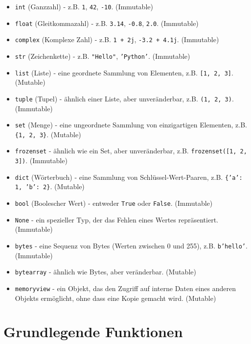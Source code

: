 \documentclass[11pt, oneside]{book}
\begin{document}
\begin{itemize}
    \item \texttt{int} (Ganzzahl) - z.B. \texttt{1}, \texttt{42}, \texttt{-10}. (Immutable)
    \item \texttt{float} (Gleitkommazahl) - z.B. \texttt{3.14}, \texttt{-0.8}, \texttt{2.0}. (Immutable)
    \item \texttt{complex} (Komplexe Zahl) - z.B. \texttt{1 + 2j}, \texttt{-3.2 + 4.1j}. (Immutable)
    \item \texttt{str} (Zeichenkette) - z.B. \texttt{"Hello"}, \texttt{'Python'}. (Immutable)
    \item \texttt{list} (Liste) - eine geordnete Sammlung von Elementen, z.B. \texttt{[1, 2, 3]}. (Mutable)
    \item \texttt{tuple} (Tupel) - ähnlich einer Liste, aber unveränderbar, z.B. \texttt{(1, 2, 3)}. (Immutable)
    \item \texttt{set} (Menge) - eine ungeordnete Sammlung von einzigartigen Elementen, z.B. \texttt{\{1, 2, 3\}}. (Mutable)
    \item \texttt{frozenset} - ähnlich wie ein Set, aber unveränderbar, z.B. \texttt{frozenset([1, 2, 3])}. (Immutable)
    \item \texttt{dict} (Wörterbuch) - eine Sammlung von Schlüssel-Wert-Paaren, z.B. \texttt{\{'a': 1, 'b': 2\}}. (Mutable)
    \item \texttt{bool} (Boolescher Wert) - entweder \texttt{True} oder \texttt{False}. (Immutable)
    \item \texttt{None} - ein spezieller Typ, der das Fehlen eines Wertes repräsentiert. (Immutable)
    \item \texttt{bytes} - eine Sequenz von Bytes (Werten zwischen 0 und 255), z.B. \texttt{b'hello'}. (Immutable)
    \item \texttt{bytearray} - ähnlich wie Bytes, aber veränderbar. (Mutable)
    \item \texttt{memoryview} - ein Objekt, das den Zugriff auf interne Daten eines anderen Objekts ermöglicht, ohne dass eine Kopie gemacht wird. (Mutable)
\end{itemize}



\section{Grundlegende Funktionen}
\end{document}

